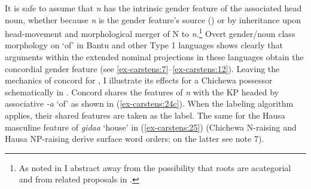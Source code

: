 \documentclass[output=paper
,modfonts
,nonflat]{langsci/langscibook}
\begin{document}
It is safe to assume that \textit{n} has the intrinsic gender feature of the associated head noun, whether because \textit{n} is the gender feature's source (\citealt{Lecarme2002,Kihm2005,Kramer2015}) or by inheritance upon head-movement and morphological merger of N to \textit{n}.\footnote{As noted in  I abstract away from the possibility that roots are acategorial and from related proposals in \citet{Chomsky2015}.} Overt gender/noun class morphology on `of' in Bantu and other Type 1 languages shows clearly that arguments within the extended nominal projections in these languages obtain the concordial gender feature (see \ref{ex-carstens:7}--\ref{ex-carstens:12}). Leaving the mechanics of concord for , I illustrate its effects for a Chichewa possessor schematically in . Concord shares the features of \textit{n} with the KP headed by associative \textit{-a} ‘of’ as shown in (\ref{ex-carstens:24c}). When the labeling algorithm applies, their shared features are taken as the label. The same for the Hausa masculine feature of \textit{gidaa} `house' in (\ref{ex-carstens:25}) (Chichewa N-raising and Hausa NP-raising derive surface word orders; on the latter see note 7). 
\end{document}
